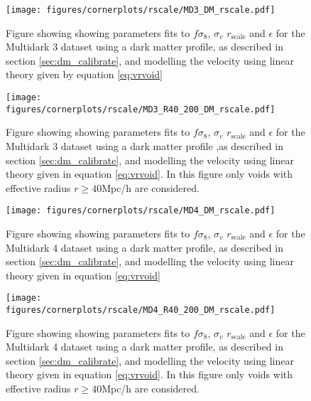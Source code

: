 \begin{figure}[H]
    \texttt{[image: figures/cornerplots/rscale/MD3\_DM\_rscale.pdf]}
    \caption{Figure showing showing parameters fits to $f\sigma_8$, $\sigma_v$ $r_{\mathrm{scale}}$ and $\epsilon$ for the Multidark 3 dataset using a dark matter profile, as described in section \ref{sec:dm_calibrate}, and modelling the velocity using linear theory given by equation \ref{eq:vrvoid}}
    \label{fig:MD3DM}
\end{figure}

\begin{figure}[H]
    \texttt{[image: figures/cornerplots/rscale/MD3\_R40\_200\_DM\_rscale.pdf]}
    \caption{Figure showing showing parameters fits to $f\sigma_8$, $\sigma_v$ $r_{\mathrm{scale}}$ and $\epsilon$ for the Multidark 3 dataset using a dark matter profile ,as described in section \ref{sec:dm_calibrate}, and modelling the velocity using linear theory given in equation \ref{eq:vrvoid}. In this figure only voids with effective radius $r \geq 40$Mpc/h are considered.}
    \label{fig:MD3DMR40}
\end{figure}

\begin{figure}[H]
    \texttt{[image: figures/cornerplots/rscale/MD4\_DM\_rscale.pdf]}
    \caption{Figure showing showing parameters fits to $f\sigma_8$, $\sigma_v$ $r_{\mathrm{scale}}$ and $\epsilon$ for the Multidark 4 dataset using a dark matter profile, as described in section \ref{sec:dm_calibrate}, and modelling the velocity using linear theory given in equation \ref{eq:vrvoid}}
    \label{fig:MD4DM}
\end{figure}

\begin{figure}[H]
    \texttt{[image: figures/cornerplots/rscale/MD4\_R40\_200\_DM\_rscale.pdf]}
    \caption{Figure showing showing parameters fits to $f\sigma_8$, $\sigma_v$ $r_{\mathrm{scale}}$ and $\epsilon$ for the Multidark 4 dataset using a dark matter profile, as described in section \ref{sec:dm_calibrate}, and modelling the velocity using linear theory given in equation \ref{eq:vrvoid}. In this figure only voids with effective radius $r \geq 40$Mpc/h are considered.}
    \label{fig:MD4DMR40}
\end{figure}

